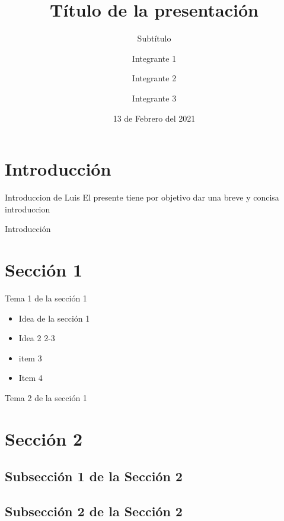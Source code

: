 \documentclass{beamer}
\title{Título de la presentación}
\subtitle{Subtítulo} %
\author{Integrante 1 \and Integrante 2 \and Integrante 3}
\institute[E.P.N]{Escuela Politécnica Nacional \par Facultad de Ingeniería en Sistemas \par Nombre de la materia}
\date{13 de Febrero del 2021} %
\begin{document}
    \frame{\titlepage}

    \frame{\tableofcontents}


    \section{Introducción}
    \begin{frame}{Introduccion de Luis}
        El presente tiene por objetivo dar una breve y concisa introduccion
    \end{frame}
    \begin{frame}{Introducción}
    \end{frame}


    \section{Sección 1}
    \begin{frame}{Tema 1 de la sección 1}
	    \begin{itemize}
            \item Idea de la sección 1
            \item Idea 2 2-3 
	    \item item 3
            \item Item 4
        \end{itemize}
    \end{frame}
    \begin{frame}{Tema 2 de la sección 1}
    \end{frame}


    \section{Sección 2}
    \subsection{Subsección 1 de la Sección 2}
    \subsection{Subsección 2 de la Sección 2}
\end{document}
